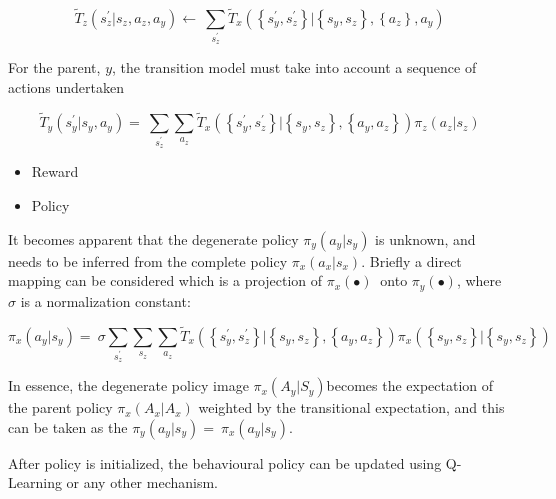 \documentclass[compsoc,journal,letterpaper,10pt,draftclsnofoot,onecolumn]{IEEEtran}
\begin{document}
 
\begin{equation}
{\tilde{T}}_{z}\left( s_{z}^{'}|s_{z}^{\ },a_{z},a_{y} \right) \leftarrow \ \sum_{s_{z}^{'}}^{\ }{{\tilde{T}}_{x}\left( \left\{ s_{y}^{'},s_{z}^{'} \right\}|\left\{ s_{y}^{\ },s_{z}^{\ } \right\},\left\{ a_{z} \right\},a_{y} \right)}
\end{equation} 

For the parent, \(y\), the transition model must take into account a
sequence of actions undertaken

 
\begin{equation}
{\tilde{T}}_{y}\left( s_{y}^{'}|s_{y}^{\ },a_{y} \right) = \ \sum_{s_{z}^{'}}^{\ }{\sum_{a_{z}}^{\ }{{\tilde{T}}_{x}\left( \left\{ s_{y}^{'},s_{z}^{'} \right\}|\left\{ s_{y}^{\ },s_{z}^{\ } \right\},\left\{ a_{y},a_{z} \right\} \right)\pi_{z}\left( a_{z}|s_{z} \right)}}
\end{equation}
 

\begin{itemize}
\item
  Reward
\item
  Policy
\end{itemize}

It becomes apparent that the degenerate policy
\(\pi_{y}\left( a_{y}|s_{y} \right)\) is unknown, and needs to be
inferred from the complete policy \(\pi_{x}\left( a_{x}|s_{x} \right)\).
Briefly a direct mapping can be considered which is a projection of
\(\pi_{x}\left( \bullet \right)\ \) onto
\(\pi_{y}\left( \bullet \right)\), where \(\sigma\) is a normalization
constant:

\begin{equation}
\pi_{x}\left( a_{y}|s_{y} \right) = \ \sigma\sum_{s_{z}^{'}}^{\ }{\sum_{s_{z}}^{\ }{\sum_{a_{z}}^{\ }{{\tilde{T}}_{x}\left( \left\{ s_{y}^{'},s_{z}^{'} \right\}|\left\{ s_{y}^{\ },s_{z}^{\ } \right\},\left\{ a_{y},a_{z} \right\} \right)\pi_{x}\left( \left\{ s_{y}^{\ },s_{z}^{\ } \right\}|\left\{ s_{y}^{\ },s_{z}^{\ } \right\} \right)}}}
\end{equation}
 

In essence, the degenerate policy image
\(\pi_{x}\left( A_{y}|S_{y} \right)\)becomes the expectation of the
parent policy \(\pi_{x}\left( A_{x}|A_{x} \right)\) weighted by the
transitional expectation, and this can be taken as the
\(\pi_{y}\left( a_{y}|s_{y} \right) = \ \pi_{x}\left( a_{y}|s_{y} \right)\).

After policy is initialized, the behavioural policy can be updated using
Q-Learning or any other mechanism.
\end{document}
